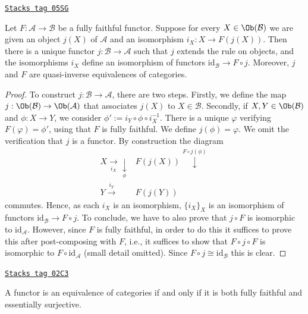 \begin{lemma}
\label{categories-lemma-construct-quasi-inverse}
\href{https://stacks.math.columbia.edu/tag/05SG}{\texttt{Stacks tag 05SG}}

Let $F : \mathcal{A} \to \mathcal{B}$ be a fully faithful functor.
Suppose for every $X \in \Ob(\mathcal{B})$ we are given an
object $j(X)$ of $\mathcal{A}$ and an isomorphism $i_X : X \to F(j(X))$.
Then there is a unique functor $j : \mathcal{B} \to \mathcal{A}$
such that $j$ extends the rule on objects, and the isomorphisms
$i_X$ define an isomorphism of functors
$\text{id}_\mathcal{B} \to F \circ j$. Moreover, $j$ and $F$
are quasi-inverse equivalences of categories.
\end{lemma}

\begin{proof}
To construct $j : \mathcal{B} \to \mathcal{A}$, there are two steps. Firstly,
we define the map $j : \Ob(\mathcal{B}) \to \Ob(\mathcal{A})$ that associates
$j(X)$ to $X \in \mathcal{B}$. Secondly, if $X,Y \in \Ob(\mathcal{B})$ and
$\phi : X \to Y$, we consider $\phi' := i_Y \circ\phi\circ i_X^{-1}$. There is
a unique $\varphi$ verifying $F(\varphi) = \phi'$, using that $F$ is fully
faithful. We define $j(\phi) = \varphi$. We omit the verification that $j$
is a functor. By construction the diagram
$$
\begin{array}{cc}X \underset{i_X}{\longrightarrow}\underset{\phi}{\downarrow} & F(j(X)) \overset{F\circ j(\phi)}{\downarrow} \\ Y \overset{i_Y}{\longrightarrow} & F(j(Y))\end{array}
$$
commutes. Hence, as each $i_X$ is an isomorphism, $\{i_X\}_X$ is an
isomorphism of functors $\text{id}_\mathcal{B} \to F\circ j$. To conclude, we
have to also prove that $j \circ F$ is isomorphic to $\text{id}_\mathcal{A}$.
However, since $F$ is fully faithful, in order to do this it suffices
to prove this after post-composing with $F$, i.e., it suffices to
show that $F \circ j \circ F$ is isomorphic to $F \circ \text{id}_\mathcal{A}$
(small detail omitted). Since $F \circ j \cong \text{id}_\mathcal{B}$
this is clear.
\end{proof}

\begin{lemma}
\label{categories-lemma-equivalence-categories}
\href{https://stacks.math.columbia.edu/tag/02C3}{\texttt{Stacks tag 02C3}}

A functor is an equivalence of categories if and only if it is both fully
faithful and essentially surjective.
\end{lemma}

